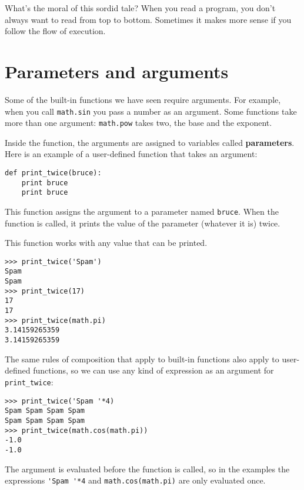 What's the moral of this sordid tale?  When you read a program, you
don't always want to read from top to bottom.  Sometimes it makes
more sense if you follow the flow of execution.


\section{Parameters and arguments}
\label{parameters}

Some of the built-in functions we have seen require arguments.  For
example, when you call {\tt math.sin} you pass a number
as an argument.  Some functions take more than one argument:
{\tt math.pow} takes two, the base and the exponent.

Inside the function, the arguments are assigned to
variables called {\bf parameters}.  Here is an example of a
user-defined function that takes an argument:


\beforeverb
\begin{verbatim}
def print_twice(bruce):
    print bruce
    print bruce
\end{verbatim}
\afterverb
%
This function assigns the argument to a parameter
named {\tt bruce}.  When the function is called, it prints the value of
the parameter (whatever it is) twice.

This function works with any value that can be printed.

\beforeverb
\begin{verbatim}
>>> print_twice('Spam')
Spam
Spam
>>> print_twice(17)
17
17
>>> print_twice(math.pi)
3.14159265359
3.14159265359
\end{verbatim}
\afterverb
%
The same rules of composition that apply to built-in functions also
apply to user-defined functions, so we can use any kind of expression
as an argument for \verb"print_twice":


\beforeverb
\begin{verbatim}
>>> print_twice('Spam '*4)
Spam Spam Spam Spam
Spam Spam Spam Spam
>>> print_twice(math.cos(math.pi))
-1.0
-1.0
\end{verbatim}
\afterverb
%
The argument is evaluated before the function is called, so
in the examples the expressions \verb"'Spam '*4" and
{\tt math.cos(math.pi)} are only evaluated once.


